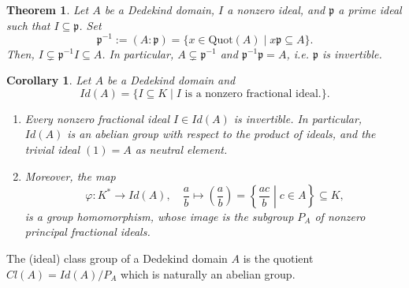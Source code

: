 \documentclass[a4paper]{book}
\theoremstyle{break}
\theoremstyle{plain}
\newtheorem{theorem}{Theorem}[definition]
\newtheorem{corollary}{Corollary}
\begin{document}
\begin{theorem}
    Let \(A\) be a Dedekind domain, \(I\) a nonzero ideal, and \(\mathfrak{p}\) a prime ideal such that \(I \subseteq \mathfrak{p}\). Set
    \begin{equation}
        \mathfrak{p}^{-1} := (A : \mathfrak{p}) = \{x \in \text{Quot}(A) \mid x \mathfrak{p} \subseteq A\} \text{.}
    \end{equation}
    Then, \(I \subsetneq \mathfrak{p}^{-1} I \subseteq A\). In particular, \(A \subsetneq \mathfrak{p}^{-1}\) and \(\mathfrak{p}^{-1}\mathfrak{p} = A\), i.e. \(\mathfrak{p}\) is invertible.
\end{theorem}

\begin{corollary}
    Let \(A\) be a Dedekind domain and
    \begin{equation}
        Id(A) = \{I \subseteq K \mid I \text{ is a nonzero fractional ideal.}\} \text{.}
    \end{equation}
    \begin{enumerate}
        \item Every nonzero fractional ideal \(I \in Id(A)\) is invertible. In particular, \(Id(A)\) is an abelian group with respect to the product of ideals, and the trivial ideal \((1) = A\) as neutral element.
        \item Moreover, the map
        \begin{equation}
            \varphi: K^* \rightarrow Id(A), \quad \frac{a}{b} \mapsto \left(\frac{a}{b}\right) = \left\{\frac{ac}{b} \middle| c \in A \right\} \subseteq K \text{,}
        \end{equation}
        is a group homomorphism, whose image is the subgroup \(P_A\) of nonzero principal fractional ideals.
    \end{enumerate}
\end{corollary}

\begin{definition}
    The {\color{maththen}(ideal) class group} of a {\color{mathif}Dedekind domain} \(A\) is the quotient \(Cl(A) = Id(A) / P_A\) which is naturally an abelian group.
\end{definition}
\end{document}
